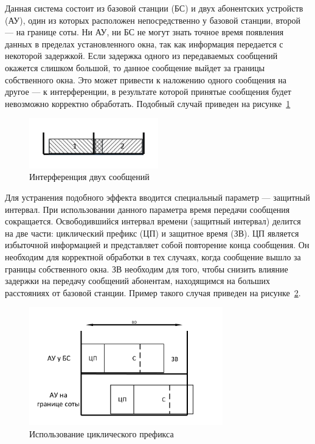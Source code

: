 Данная система состоит из базовой станции (БС) и двух абонентских устройств (АУ), один из которых
расположен непосредственно у базовой станции, второй --- на границе соты. Ни АУ, ни БС не могут знать
точное время появления данных в пределах установленного окна, так как информация передается с
некоторой задержкой. Если задержка одного из передаваемых сообщений окажется слишком большой, то
данное сообщение выйдет за границы собственного окна. Это может привести к наложению одного сообщения
на другое --- к интерференции, в результате которой принятые сообщения будет невозможно корректно
обработать. Подобный случай приведен на рисунке~\ref{fig:vol_interf}
\begin{figure}[H]
    \centering
    \includegraphics[width=0.5\textwidth]{img/vol_interf}
    \caption{Интерференция двух сообщений}
    \label{fig:vol_interf}
\end{figure}
Для устранения подобного эффекта вводится специальный параметр --- защитный интервал.
При использовании данного параметра время передачи сообщения сокращается. Освободившийся интервал
времени (защитный интервал) делится на две части: циклический префикс (ЦП) и защитное время (ЗВ).
ЦП является избыточной информацией и представляет собой повторение конца сообщения.
Он необходим для корректной обработки в тех случаях, когда сообщение вышло за границы
собственного окна. ЗВ необходим для того, чтобы снизить влияние задержки на передачу сообщений
абонентам, находящимся на больших расстояниях от базовой станции. Пример такого случая
приведен на рисунке~\ref{fig:vol_CP}. 
\begin{figure}[H]
    \centering
    \includegraphics[width=0.75\textwidth]{img/vol_CP}
    \caption{Использование циклического префикса}
    \label{fig:vol_CP}
\end{figure}


